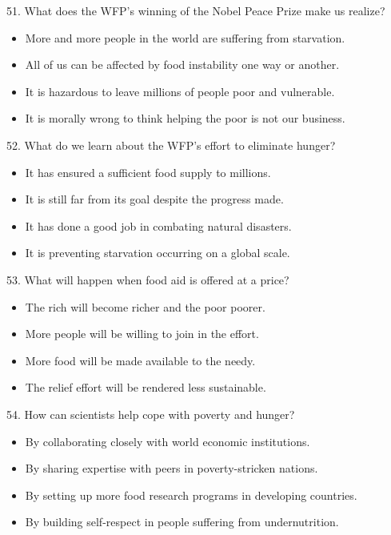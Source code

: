 \documentclass[UTF8,11pt]{ctexart}
\begin{document}
51. What does the WFP's winning of the Nobel Peace Prize make us realize?


\begin{itemize}[leftmargin=2em,itemsep=.2em,topsep=.4em]\item[A.] More and more people in the world are suffering from starvation.
\item[B.] All of us can be affected by food instability one way or another.
\item[C.] It is hazardous to leave millions of people poor and vulnerable.
\item[D.] It is morally wrong to think helping the poor is not our business.
\end{itemize}

52. What do we learn about the WFP's effort to eliminate hunger?


\begin{itemize}[leftmargin=2em,itemsep=.2em,topsep=.4em]\item[A.] It has ensured a sufficient food supply to millions.
\item[B.] It is still far from its goal despite the progress made.
\item[C.] It has done a good job in combating natural disasters.
\item[D.] It is preventing starvation occurring on a global scale.
\end{itemize}

53. What will happen when food aid is offered at a price?


\begin{itemize}[leftmargin=2em,itemsep=.2em,topsep=.4em]\item[A.] The rich will become richer and the poor poorer.
\item[B.] More people will be willing to join in the effort.
\item[C.] More food will be made available to the needy.
\item[D.] The relief effort will be rendered less sustainable.
\end{itemize}

54. How can scientists help cope with poverty and hunger?


\begin{itemize}[leftmargin=2em,itemsep=.2em,topsep=.4em]\item[A.] By collaborating closely with world economic institutions.
\item[B.] By sharing expertise with peers in poverty-stricken nations.
\item[C.] By setting up more food research programs in developing countries.
\item[D.] By building self-respect in people suffering from undernutrition.
\end{itemize}
\end{document}
